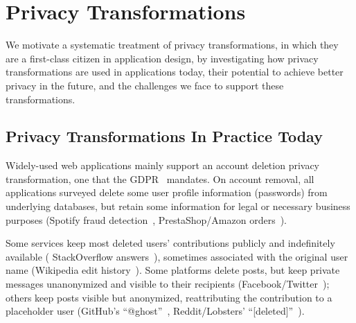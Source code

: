 \section{Privacy Transformations}
\label{sec:survey}

We motivate a systematic treatment of privacy transformations, in which they are a first-class citizen in
application design, by investigating how privacy transformations are used in applications today,
their potential to achieve better privacy in the future, and the challenges we face to support these
transformations.

\subsection{Privacy Transformations In Practice Today}
%
%
Widely-used web applications mainly support an account deletion privacy transformation,
one that \eg the GDPR~\cite[Art.\ 17]{eu:gdpr} mandates.
%
On account removal, all applications surveyed delete some user profile
information (\eg passwords) from underlying databases, but 
retain some information for legal or necessary business purposes
(\eg Spotify fraud detection~\cite{spotify:privacy}, PrestaShop/Amazon
orders~\cite{amazon:privacy, prestashop:privacy}).
%

Some services keep most deleted users' contributions publicly and indefinitely available (\eg
StackOverflow answers~\cite{stackoverflow:privacy}), sometimes associated with the original user
name (\eg Wikipedia edit history~\cite{wikipedia:privacy}).
%
Some platforms delete posts, but keep private messages unanonymized and visible to
their recipients (Facebook/Twitter~\cite{facebook:privacy, twitter:privacy});
%
others keep posts visible but anonymized, reattributing the contribution to a placeholder user
(\eg GitHub's ``@ghost''~\cite{github:privacy}, Reddit/Lobsters'
``[deleted]''~\cite{reddit:privacy, lobsters:privacy}).
%
%

